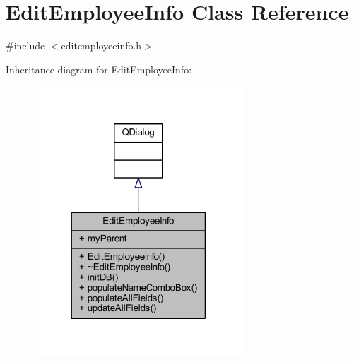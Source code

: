 \hypertarget{class_edit_employee_info}{}\section{Edit\+Employee\+Info Class Reference}
\label{class_edit_employee_info}


{\ttfamily \#include $<$editemployeeinfo.\+h$>$}



Inheritance diagram for Edit\+Employee\+Info\+:
\nopagebreak
\begin{figure}[H]
\begin{center}
\leavevmode
\includegraphics[width=222pt]{class_edit_employee_info__inherit__graph}
\end{center}
\end{figure}


